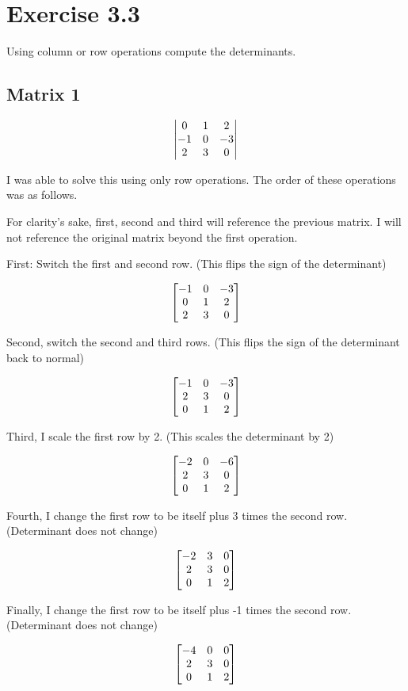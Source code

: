 \section{Exercise 3.3}

Using column or row operations compute the determinants.

\subsection{Matrix 1}

\[
	\genericmat{v}{0 & 1 & 2 \\ -1 & 0 & -3 \\ 2 & 3 & 0}
\]

I was able to solve this using only row operations. The order of these operations was as follows.

For clarity's sake, first, second and third will reference the previous matrix. I will not reference the original matrix beyond the first operation.

First: Switch the first and second row. (This flips the sign of the determinant)

\[
	\genericmat{b}{-1 & 0 & -3 \\ 0 & 1 & 2 \\ 2 & 3 & 0}
\]

Second, switch the second and third rows. (This flips the sign of the determinant back to normal)

\[
	\genericmat{b}{-1 & 0 & -3 \\ 2 & 3 & 0 \\ 0 & 1 & 2 }
\]

Third, I scale the first row by 2. (This scales the determinant by 2)

\[
	\genericmat{b}{-2 & 0 & -6 \\ 2 & 3 & 0 \\ 0 & 1 & 2 }
\]

Fourth, I change the first row to be itself plus 3 times the second row. (Determinant does not change)

\[
	\genericmat{b}{-2 & 3 & 0 \\ 2 & 3 & 0 \\ 0 & 1 & 2 }
\]

Finally, I change the first row to be itself plus -1 times the second row. (Determinant does not change)

\[
	\genericmat{b}{-4 & 0 & 0 \\ 2 & 3 & 0 \\ 0 & 1 & 2 }
\]


